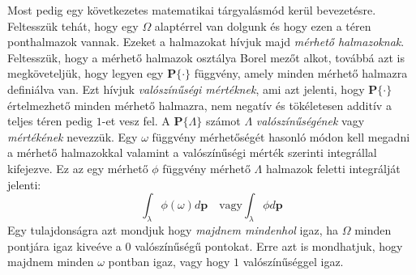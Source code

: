\documentclass{article}
\begin{document}
Most pedig egy következetes matematikai tárgyalásmód kerül bevezetésre. Feltesszük tehát, hogy egy $\Omega$ alaptérrel van dolgunk és hogy ezen a téren ponthalmazok vannak. Ezeket a halmazokat hívjuk majd \textit{mérhető halmazoknak}. Feltesszük, hogy a mérhető halmazok osztálya Borel mezőt alkot, továbbá azt is megköveteljük, hogy legyen egy $\mathbf{P}\{\cdot\}$ függvény, amely minden mérhető halmazra definiálva van. Ezt hívjuk \textit{valószínűségi mértéknek}, ami azt jelenti, hogy $\mathbf{P}\{\cdot\}$ értelmezhető minden mérhető halmazra, nem negatív és tökéletesen additív a teljes téren pedig $1$-et vesz fel. A $\mathbf{P}\{\Lambda\}$ számot $\Lambda$ \textit{valószínűségének} vagy \textit{mértékének} nevezzük. Egy $\omega$ függvény mérhetőségét hasonló módon kell megadni a mérhető halmazokkal valamint a valószínűségi mérték szerinti integrállal kifejezve. Ez az egy mérhető $\phi$ függvény mérhető $\Lambda$ halmazok feletti integrálját jelenti:
\begin{equation}
\int_{\lambda} \phi(\omega) d \mathrm{\textbf{p}} \quad \mathrm{vagy} \int_{\lambda} \phi d \mathrm{\textbf{p}}
\end{equation}
Egy tulajdonságra azt mondjuk hogy \textit{majdnem mindenhol} igaz, ha $\Omega$ minden pontjára igaz kiveéve a $0$ valószínűségű pontokat. Erre azt is mondhatjuk, hogy majdnem minden $\omega$ pontban igaz, vagy hogy $1$ valószínűséggel igaz. 
\end{document}
